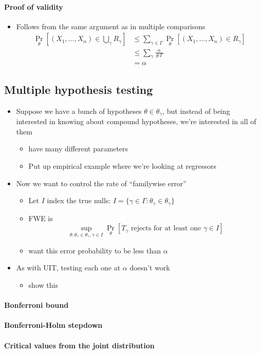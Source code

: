 \paragraph{Proof of validity}
\begin{itemize}
\item Follows from the same argument as in multiple comparisons
  \begin{align*}
    \Pr_\theta[(X_1,\dots,X_n) \in \bigcup_{\gamma} R_\gamma] 
    &\leq \sum_{\gamma \in \Gamma} \Pr_\theta[(X_1,\dots,X_n) \in R_\gamma] \\
    &\leq \sum_\gamma \frac{\alpha}{\#\Gamma} \\
    &= \alpha
  \end{align*}
\end{itemize}

\subsection{Multiple hypothesis testing}

\begin{itemize}
\item Suppose we have a bunch of hypotheses $\theta \in \theta_\gamma$, but instead of
  being interested in knowing about compound hypotheses, we're
  interested in all of them
  \begin{itemize}
  \item have many different parameters
  \item Put up empirical example where we're looking at regressors
  \end{itemize}
\item Now we want to control the rate of ``familywise error''
  \begin{itemize}
  \item Let $I$ index the true nulls: $I = \{\gamma \in \Gamma : \theta_\gamma \in \theta_\gamma\}$
  \item FWE is \[\sup_{\theta: \theta_\gamma \in \theta_\gamma, \gamma \in I} \Pr_\theta[T_\gamma \text{ rejects
      for at least one } \gamma \in I]\]
  \item want this error probability to be less than $\alpha$
  \end{itemize}
\item As with UIT, testing each one at $\alpha$ doesn't work
  \begin{itemize}
  \item show this
  \end{itemize}
\end{itemize}

\paragraph{Bonferroni bound}

\paragraph{Bonferroni-Holm stepdown}

\paragraph{Critical values from the joint distribution}

